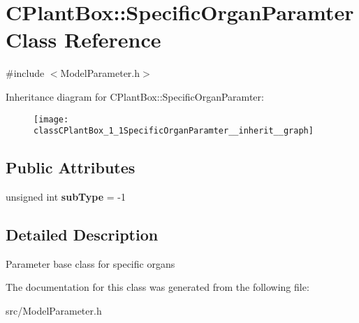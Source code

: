 \hypertarget{classCPlantBox_1_1SpecificOrganParamter}{}\section{C\+Plant\+Box\+:\+:Specific\+Organ\+Paramter Class Reference}
\label{classCPlantBox_1_1SpecificOrganParamter}


{\ttfamily \#include $<$Model\+Parameter.\+h$>$}



Inheritance diagram for C\+Plant\+Box\+:\+:Specific\+Organ\+Paramter\+:\nopagebreak
\begin{figure}[H]
\begin{center}
\leavevmode
\texttt{[image: classCPlantBox\_1\_1SpecificOrganParamter\_\_inherit\_\_graph]}
\end{center}
\end{figure}
\subsection*{Public Attributes}
\begin{DoxyCompactItemize}
\item 
\mbox{\label{classCPlantBox_1_1SpecificOrganParamter_a2d5c60ed993f4731d9221296f4fe6321}} 
unsigned int {\bfseries sub\+Type} = -\/1
\end{DoxyCompactItemize}


\subsection{Detailed Description}
Parameter base class for specific organs 

The documentation for this class was generated from the following file\+:\begin{DoxyCompactItemize}
\item 
src/Model\+Parameter.\+h\end{DoxyCompactItemize}
